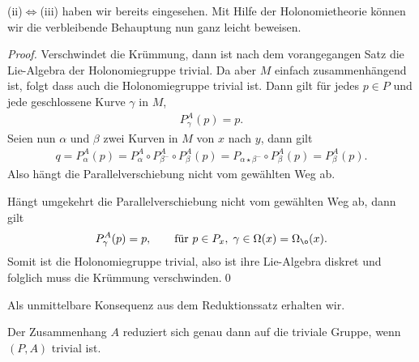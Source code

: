 \documentclass[%
	paper=a5,%
	fleqn,%
	DIV=18,%
	BCOR=0mm,
	fontsize=11pt,
	titlepage=false,%
	bibliography=totoc,
	DIV=18,%
	twoside=true,
	pdftitle=Riemannsche Geometrie,
	pdfauthor=Uwe Semmelmann,
	numbers=noendperiod]%
	{scrbook}
\begin{document}
(ii)$\iff$(iii) haben wir bereits eingesehen. Mit Hilfe der Holonomietheorie können wir die verbleibende Behauptung nun ganz leicht beweisen.
\begin{proof}
Verschwindet die Krümmung, dann ist nach dem vorangegangen Satz die Lie-Algebra der Holonomiegruppe trivial. Da aber $M$ einfach zusammenhängend ist, folgt dass auch die Holonomiegruppe trivial ist. Dann gilt für jedes $p\in P$ und jede geschlossene Kurve $\gamma$ in $M$, 
\begin{align*}
P_{\gamma}^A(p) = p.
\end{align*}
Seien nun $\alpha$ und $\beta$ zwei Kurven in $M$ von $x$ nach $y$, dann gilt
\begin{align*}
q = P_{\alpha}^A(p) = P_{\alpha}^A\circ P_{\beta^-}^A\circ P_{\beta}^A(p)
= P_{\alpha\star\beta^-}\circ P_{\beta}^A(p)
= P_{\beta}^A(p).
\end{align*}
Also hängt die Parallelverschiebung nicht vom gewählten Weg ab.

Hängt umgekehrt die Parallelverschiebung nicht vom gewählten Weg ab, dann gilt
\begin{align*}
P_{\gamma}^A(p) = p,\qquad  \text{für } p\in P_{x},\; \gamma\in\Omega(x) = \Omega_{\o}(x).
\end{align*}
Somit ist die Holonomiegruppe trivial, also ist ihre Lie-Algebra diskret und folglich muss die Krümmung verschwinden.\qed
\end{proof}

Als unmittelbare Konsequenz aus dem Reduktionssatz erhalten wir.

\begin{cor}
Der Zusammenhang $A$ reduziert sich genau dann auf die triviale Gruppe, wenn $(P,A)$ trivial ist.\fish
\end{cor}
\end{document}
